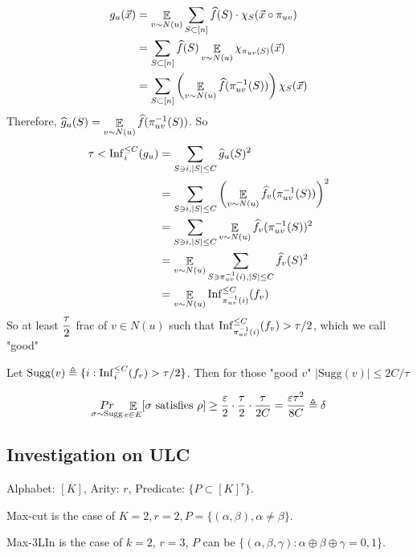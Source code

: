 \[\begin{aligned}
    g_u(\vec{x})&=\mathop\mathbb E_{v\sim N(u)}\sum_{S\subset [n]}\widehat{f}(S)\cdot \chi_S(\vec{x}\circ \pi_{uv})\\
    &=\sum_{S\subset [n]}\widehat{f}(S)\mathop\mathbb E_{v\sim N(u)}\chi_{\pi_{uv}(S)}(\vec{x})\\
    &=\sum_{S\subset [n]}\left(\mathop\mathbb E_{v\sim N(u)}\widehat{f}(\pi_{uv}^{-1}(S))\right)\chi_S(\vec{x})
\end{aligned}\]
Therefore,  $ \displaystyle\widehat{g}_u(S)=\mathop\mathbb E_{v\sim N(u)}\widehat{f}(\pi_{uv}^{-1}(S)) $. So 
\[\begin{aligned}
    \tau<\mathrm{Inf}^{\leq C}_i(g_u)&=\sum_{S\ni i,|S| \leq C}\widehat{g}_u(S)^2\\
    &=\sum_{S\ni i,|S| \leq C}\left(\mathop\mathbb E_{v\sim N(u)}\widehat{f}_v(\pi_{uv}^{-1}(S))\right)^2\\
    &=\sum_{S\ni i,|S| \leq C}\mathop\mathbb E_{v\sim N(u)}\widehat{f}_v(\pi_{uv}^{-1}(S))^2\\
    &=\mathop\mathbb E_{v\sim N(u)}\sum_{S\ni \pi_{uv}^{-1}(i),|S| \leq C}\widehat{f}_v(S)^2\\
    &=\mathop\mathbb E_{v\sim N(u)}\mathrm{Inf}_{\pi_{uv}^{-1}(i)}^{ \leq C}(f_v)
\end{aligned}\]
So at least  $ \displaystyle\frac{\tau}{2} $ frac of  $ v\in N(u) $ such that  $ \displaystyle\mathrm{Inf}_{\pi_{uv}^{-1}(i)}^{ \leq C}(f_v) >\tau/2 $, which we call "good"

Let  $ \mathrm{Sugg}(v)\triangleq \{i:\mathrm{Inf}^{\leq C}_i(f_v)>\tau/2\} $. Then for those "good  $ v $"  $ |\mathrm{Sugg}(v)| \leq 2C/\tau $  

\[\mathop{Pr}_{\sigma\sim \mathrm{Sugg}}\mathop\mathbb E_{e\in E}[\sigma \text{ satisfies }\rho] \geq \frac{\varepsilon}{2}\cdot \frac{\tau}{2}\cdot\frac{\tau}{2C}=\frac{\varepsilon\tau^2}{8C}\triangleq \delta\]

\subsection{Investigation on ULC}
\begin{definition}
    Alphabet:  $ [K] $, Arity: $ r $, Predicate:  $ \{P\subset [K]^r\} $.  
\end{definition}
Max-cut is the case of  $ K=2, r=2,P=\{(\alpha,\beta),\alpha\neq \beta\} $.

Max-3LIn is the case of $ k=2 $,  $ r=3 $,  $ P $ can be $ \{(\alpha,\beta,\gamma):\alpha\oplus\beta\oplus \gamma =0,1\} $.